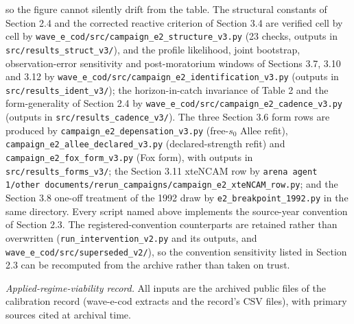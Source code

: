 so the figure cannot silently drift from the table. The structural
constants of Section 2.4 and the corrected reactive
criterion of Section 3.4 are verified cell by cell by
\texttt{wave\_e\_cod/src/\allowbreak{}campaign\_e2\_structure\_v3.py} (23 checks,
outputs in \texttt{src/results\_struct\_v3/}), and the profile
likelihood, joint bootstrap, observation-error sensitivity and
post-moratorium windows of Sections 3.7, 3.10 and 3.12 by
\texttt{wave\_e\_cod/src/\allowbreak{}campaign\_e2\_identification\_v3.py}
(outputs in \texttt{src/results\_ident\_v3/}); the horizon-in-catch invariance of Table 2 and the form-generality of Section 2.4 by
\texttt{wave\_e\_cod/src/\allowbreak{}campaign\_e2\_cadence\_v3.py} (outputs in \texttt{src/results\_cadence\_v3/}). The three Section 3.6
form rows are produced by
\texttt{campaign\_e2\_depensation\_v3.py} (free-\(s_0\) Allee refit),
\texttt{campaign\_e2\_allee\_declared\_v3.py} (declared-strength refit)
and \texttt{campaign\_e2\_fox\_form\_v3.py} (Fox form), with outputs in
\texttt{src/results\_forms\_v3/}; the Section 3.11 xteNCAM row by
\texttt{arena agent 1/other documents/rerun\_campaigns/\allowbreak{}campaign\_e2\_xteNCAM\_row.py};
and the Section 3.8 one-off treatment of the 1992 draw by
\texttt{e2\_breakpoint\_1992.py} in the same directory. Every script
named above implements the source-year convention of Section 2.3. The
registered-convention counterparts are retained rather than overwritten
(\texttt{run\_intervention\_v2.py} and its outputs, and
\texttt{wave\_e\_cod/src/superseded\_v2/}), so the convention sensitivity
listed in Section 2.3 can be recomputed from the archive rather than
taken on trust.

\emph{Applied-regime-viability record.} All inputs are the archived public files of the calibration record
(wave-e-cod extracts and the record's CSV files), with primary sources
cited at archival time.

